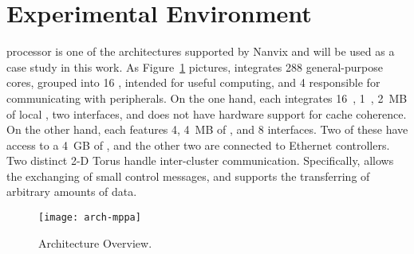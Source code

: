 \section{Experimental Environment}
\label{sec:platform}

	\mppa processor is one of the architectures supported by Nanvix and will be
	used as a case study in this work. As Figure~\ref{fig:mppa} pictures,
	\mppa integrates 288 general-purpose cores, grouped into 16 \cclusters,
	intended for useful computing, and 4 \ioclusters responsible for
	communicating with peripherals. On the one hand, each \ccluster integrates
	16~\pes, 1~\rman, 2~MB of local \sram, two \noc interfaces, and does not
	have hardware support for cache coherence. On the other hand, each
	\iocluster features 4\rmans, 4~MB of \sram, and 8 \noc interfaces. Two of
	these \ioclusters have access to a 4~GB of \dram, and the other two are
	connected to Ethernet controllers. Two distinct 2-D Torus \nocs handle
	inter-cluster communication. Specifically, \cnoc allows the exchanging of
	small control messages, and \dnoc supports the transferring of arbitrary
	amounts of data.

	\begin{figure}[tb]
			\centering
			\texttt{[image: arch-mppa]}
			\caption{\mppa Architecture Overview.}
			\label{fig:mppa}
	\end{figure}

